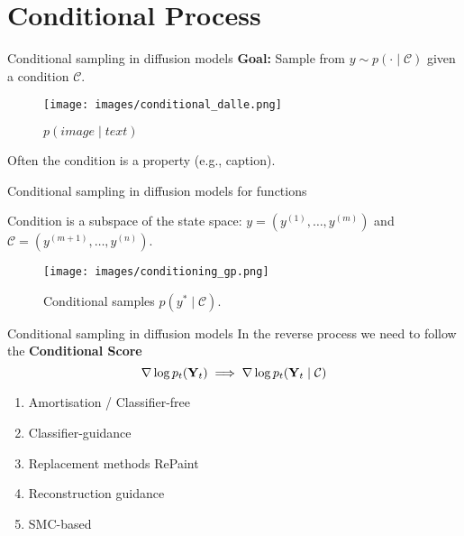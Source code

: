 

\section{Conditional Process}

\begin{frame}{Conditional sampling in diffusion models}
\textbf{Goal:} Sample from $y \sim p(\cdot \mid \mathcal{C})$ given a condition $\mathcal{C}$.\\
\pause
\begin{figure}
\centering
\texttt{[image: images/conditional\_dalle.png]}
\caption{$p(image \mid text)$}
\end{figure}
Often the condition is a property (e.g., caption).
\end{frame}

\begin{frame}{Conditional sampling in diffusion models for functions}

Condition is a subspace of the state space: $y = (y^{(1)}, \ldots, y^{(m)})$ and $\mathcal{C} = (y^{(m+1)},\ldots, y^{(n)})$.
\pause
\begin{figure}
\centering
\texttt{[image: images/conditioning\_gp.png]}
\caption{Conditional samples $p(y^*\mid \mathcal{C})$.}
\end{figure}
\end{frame}


\begin{frame}{Conditional sampling in diffusion models}
In the reverse process we need to follow the \textbf{Conditional Score}
$$
\nabla \log p_t(\mathbf{Y}_t) \implies \nabla \log p_t(\mathbf{Y}_t \mid \mathcal{C})
$$
\pause
\begin{enumerate}
    \item Amortisation / Classifier-free ~\cite{ramesh2022Hierarchical}
    \item Classifier-guidance~\cite{dhariwal2021diffusion}
    \item Replacement methods {RePaint}~\cite{lugmayr2022RePaint}
    \item Reconstruction guidance~\cite{finzi2023user}
    \item SMC-based~\cite{trippe2022Diffusion}
\end{enumerate}
\end{frame}


